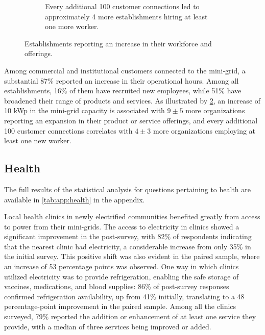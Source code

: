 \begin{figure}[th]
\begin{subfigure}[t]{0.48\textwidth}
		\caption{Every additional 100 customer connections led to approximately 4 more establishments hiring at least one more worker.}
		\label{fig:workforce_change}
	\end{subfigure}
	\caption{Establishments reporting an increase in their workforce and offerings.}
	\label{fig:ci_productivity}
\end{figure}

Among commercial and institutional customers connected to the mini-grid, a substantial 87\% reported an increase in their operational hours. Among all establishments, 16\% of them have recruited new employees, while 51\% have broadened their range of products and services. As illustrated by \cref{fig:ci_productivity}, an increase of 10 kWp in the mini-grid capacity is associated with $9\pm5$ more organizations reporting an expansion in their product or service offerings, and every additional 100 customer connections correlates with $4\pm3$ more organizations employing at least one new worker. 

\subsection{Health}
The full results of the statistical analysis for questions pertaining to health are available in \cref{tab:app:health} in the appendix.

Local health clinics in newly electrified communities benefited greatly from access to power from their mini-grids. The access to electricity in clinics showed a significant improvement in the post-survey, with 82\% of respondents indicating that the nearest clinic had electricity, a considerable increase from only 35\% in the initial survey. This positive shift was also evident in the paired sample, where an increase of 53 percentage points was observed. One way in which clinics utilized electricity was to provide refrigeration, enabling the safe storage of vaccines, medications, and blood supplies: 86\% of post-survey responses confirmed refrigeration availability, up from 41\% initially, translating to a 48 percentage-point improvement in the paired sample. Among all the clinics surveyed, 79\% reported the addition or enhancement of at least one service they provide, with a median of three services being improved or added.

